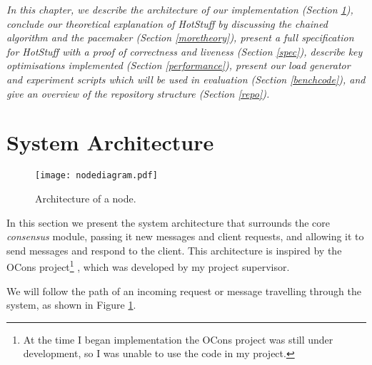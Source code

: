\textit{In this chapter, we describe the architecture of our implementation (Section \ref{architecture}), conclude our theoretical explanation of HotStuff by discussing the chained algorithm and the pacemaker (Section \ref{moretheory}), present a full specification for HotStuff with a proof of correctness and liveness (Section \ref{spec}), describe key optimisations implemented (Section \ref{performance}), present our load generator and experiment scripts which will be used in evaluation (Section \ref{benchcode}), and give an overview of the repository structure (Section \ref{repo}).}

\section{System Architecture} \label{architecture}

\begin{figure}[h!]
\centering
\texttt{[image: nodediagram.pdf]}
\caption{Architecture of a node.}
\label{nodediagram}
\end{figure}

In this section we present the system architecture that surrounds the core \textit{consensus} module, passing it new messages and client requests, and allowing it to send messages and respond to the client. This architecture is inspired by the OCons project\footnote{At the time I began implementation the OCons project was still under development, so I was unable to use the code in my project.} \cite{ocons}, which was developed by my project supervisor.

We will follow the path of an incoming request or message travelling through the system, as shown in Figure \ref{nodediagram}.

